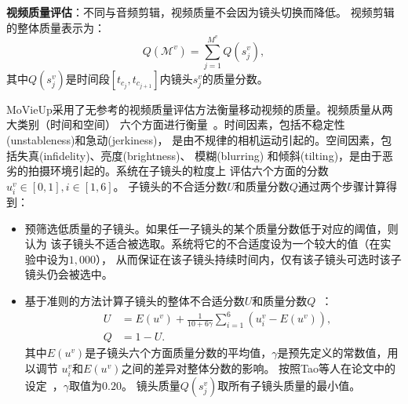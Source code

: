 \documentclass[doctor]{ustcthesis}
\begin{document}
\textbf{视频质量评估}：不同与音频剪辑，视频质量不会因为镜头切换而降低。
视频剪辑的整体质量表示为：
\begin{equation}
    Q(\mathcal{M}^v) = \sum_{j=1}^{M^v}{Q(s_j^v)},
\end{equation}
其中$Q(s_j^v)$是时间段$[t_{c_j},t_{c_{j+1}}]$内镜头$s_j^v$的质量分数。

MoVieUp采用了无参考的视频质量评估方法衡量移动视频的质量。视频质量从两大类别（时间和空间）
六个方面进行衡量~\cite{MeiHZZL07}。时间因素，包括不稳定性(unstableness)和急动(jerkiness)，
是由不规律的相机运动引起的。空间因素，包括失真(infidelity)、亮度(brightness)、
模糊(blurring) 和倾斜(tilting)，是由于恶劣的拍摄环境引起的。系统在子镜头的粒度上
评估六个方面的分数$u_i^v \in [0,1], i \in [1,6]$。
子镜头的不合适分数$U$和质量分数$Q$通过两个步骤计算得到：
\vspace{-0.4em}
\begin{itemize}\setlength{\itemsep}{-0.4em}
    \item 预筛选低质量的子镜头。如果任一子镜头的某个质量分数低于对应的阈值，则认为
        该子镜头不适合被选取。系统将它的不合适度设为一个较大的值（在实验中设为$1,000$），
        从而保证在该子镜头持续时间内，仅有该子镜头可选时该子镜头仍会被选中。
    \item 基于准则的方法计算子镜头的整体不合适分数$U$和质量分数$Q$~\cite{MeiHZZL07}：
        \begin{eqnarray}
            &U &= E(u^v) + \frac{1}{10 + 6\gamma}\sum_{i=1}^6{(u_i^v -
            E(u^v))}, \nonumber \\
            &Q &= 1 - U.
        \end{eqnarray}
        其中$E(u^v)$是子镜头六个方面质量分数的平均值，$\gamma$是预先定义的常数值，用以调节
        $u_i^v$和$E(u^v)$之间的差异对整体分数的影响。
        按照Tao等人在论文中的设定~\cite{MeiHZZL07}，$\gamma$取值为$0.20$。
        镜头质量$Q(s_j^v)$取所有子镜头质量的最小值。
\end{itemize}
\end{document}
